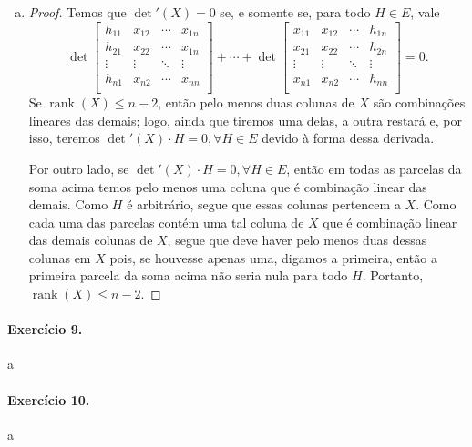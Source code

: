 \documentclass[12pt,a4paper]{article}
\DeclareMathOperator{\tr}{tr}
\DeclareMathOperator{\rank}{rank}
\begin{document}
\begin{enumerate}[a)]
\begin{proof}
\begin{align*}
                &= h_{11} + \cdots + h_{nn} \\
                &= \tr(H).
            \end{align*}
        \end{proof}
        \item 
        \begin{proof}
            Temos que $\det'(X) = 0$ se, e somente se, para todo $H\in E$, vale
            \begin{equation*}
                \det\begin{bmatrix}
                        h_{11} & x_{12} & \cdots & x_{1n} \\
                        h_{21} & x_{22} & \cdots & x_{1n} \\
                        \vdots & \vdots & \ddots & \vdots \\
                        h_{n1} & x_{n2} & \cdots & x_{nn} \\
                    \end{bmatrix}
                    + \cdots + 
                \det\begin{bmatrix}
                        x_{11} & x_{12} & \cdots & h_{1n} \\
                        x_{21} & x_{22} & \cdots & h_{2n} \\
                        \vdots & \vdots & \ddots & \vdots \\
                        x_{n1} & x_{n2} & \cdots & h_{nn} \\
                    \end{bmatrix} = 0.
            \end{equation*}
            Se $\rank(X)\leq n-2$, então pelo menos duas colunas de $X$ são combinações lineares
            das demais; logo, ainda que tiremos uma delas, a outra restará e, por isso, teremos
            $\det'(X)\cdot H = 0, \forall H\in E$ devido à forma dessa derivada.
            
            Por outro lado, se $\det'(X)\cdot H = 0, \forall H\in E$, então em todas as parcelas da soma
            acima temos pelo menos uma coluna que é combinação linear das demais. Como $H$ é arbitrário,
            segue que essas colunas pertencem a $X$. Como cada uma das parcelas contém uma tal coluna
            de $X$ que é combinação linear das demais colunas de $X$, segue que deve haver pelo menos
            duas dessas colunas em $X$ pois, se houvesse apenas uma, digamos a primeira, então a primeira
            parcela da soma acima não seria nula para todo $H$. Portanto, $\rank(X)\leq n-2$.
        \end{proof}
    \end{enumerate}
%
\paragraph{Exercício 9.}
    a
%
\paragraph{Exercício 10.}
    a
%
\end{document}
